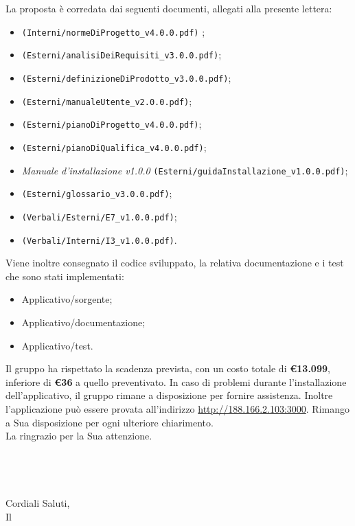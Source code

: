 \documentclass[12pt,a4paper]{article} %
\begin{document}
La proposta è corredata dai seguenti documenti, allegati alla presente lettera:
\begin{itemize}
\item \normeDiProgetto \texttt{(Interni/normeDiProgetto\_v4.0.0.pdf)} ;
\item \analisiDeiRequisiti \texttt{(Esterni/analisiDeiRequisiti\_v3.0.0.pdf)};
\item {} \texttt{(Esterni/definizioneDiProdotto\_v3.0.0.pdf)};
\item \manualeUtente \texttt{(Esterni/manualeUtente\_v2.0.0.pdf)};
\item \pianoDiProgetto \texttt{(Esterni/pianoDiProgetto\_v4.0.0.pdf)};
\item \pianoDiQualifica \texttt{(Esterni/pianoDiQualifica\_v4.0.0.pdf)};
\item \textit{Manuale d'installazione v1.0.0} \texttt{(Esterni/guidaInstallazione\_v1.0.0.pdf)};
\item \glossario \texttt{(Esterni/glossario\_v3.0.0.pdf)};
\item \eVII \texttt{(Verbali/Esterni/E7\_v1.0.0.pdf)};
\item \iIII \texttt{(Verbali/Interni/I3\_v1.0.0.pdf)}.
\end{itemize}
Viene inoltre consegnato il codice sviluppato, la relativa documentazione e i test che sono stati implementati:
\begin{itemize}
\item Applicativo/sorgente;
\item Applicativo/documentazione;
\item Applicativo/test.
\end{itemize}
Il gruppo \gruppo ha rispettato la scadenza prevista, con un costo totale di \textbf{\euro13.099}, inferiore di \textbf{\euro36} a quello preventivato. \newline
In caso di problemi durante l'installazione dell'applicativo, il gruppo rimane a disposizione per fornire assistenza. Inoltre l'applicazione può essere provata all'indirizzo \url{http://188.166.2.103:3000}.
\newline
\noindent Rimango a Sua disposizione per ogni ulteriore chiarimento. \\
La ringrazio per la Sua attenzione. \\
\\
\\
\\
\\
Cordiali Saluti, \\
Il \rRPt \\
\dm
\end{document}
